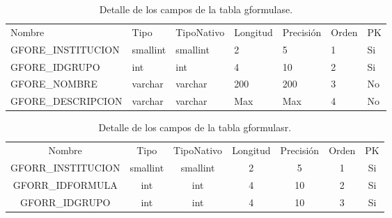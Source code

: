 				\begin{table}[H]
					\centering
					\caption{Detalle de los campos de la tabla gformulase.}
					\label{tab_gformulase}
					\begin{tabular}{|l|l|l|l|l|l|l|}
						\hline
						\rowcolor[HTML]{329A9D} 
						\multicolumn{7}{|c|}{\cellcolor[HTML]{329A9D}GFORMULASE}                       \\ \hline
						\rowcolor[HTML]{00D2CB} 
						Nombre             & Tipo     & TipoNativo & Longitud & Precisi\'on & Orden & PK \\ \hline
						GFORE\_INSTITUCION & smallint & smallint   & 2        & 5         & 1     & Si \\ \hline
						GFORE\_IDGRUPO     & int      & int        & 4        & 10        & 2     & Si \\ \hline
						GFORE\_NOMBRE      & varchar  & varchar    & 200      & 200       & 3     & No \\ \hline
						GFORE\_DESCRIPCION & varchar  & varchar    & Max      & Max       & 4     & No \\ \hline
					\end{tabular}
				\end{table}

				\begin{table}[H]
					\centering
					\caption{Detalle de los campos de la tabla gformulasr.}
					\label{tab_gformulasr}
					\begin{tabular}{|c|c|c|c|c|c|c|}
						\hline
						\rowcolor[HTML]{329A9D} 
						\multicolumn{7}{|c|}{\cellcolor[HTML]{329A9D}GFORMULASR}                       \\ \hline
						\rowcolor[HTML]{00D2CB} 
						Nombre             & Tipo     & TipoNativo & Longitud & Precisi\'on & Orden & PK \\ \hline
						GFORR\_INSTITUCION & smallint & smallint   & 2        & 5         & 1     & Si \\ \hline
						GFORR\_IDFORMULA   & int      & int        & 4        & 10        & 2     & Si \\ \hline
						GFORR\_IDGRUPO     & int      & int        & 4        & 10        & 3     & Si \\ \hline
					\end{tabular}
				\end{table}

